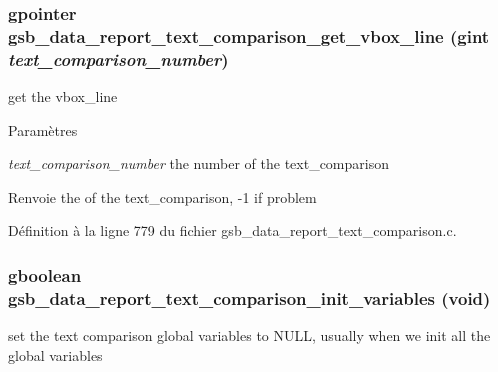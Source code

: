 \subsubsection[{gsb\_\-data\_\-report\_\-text\_\-comparison\_\-get\_\-vbox\_\-line}]{\setlength{\rightskip}{0pt plus 5cm}gpointer gsb\_\-data\_\-report\_\-text\_\-comparison\_\-get\_\-vbox\_\-line (gint {\em text\_\-comparison\_\-number})}\label{gsb__data__report__text__comparison_8h_a98e92783c34e4f3292adf3df1ac8fe4d}
get the vbox\_\-line


\begin{DoxyParams}{Paramètres}
\item[{\em text\_\-comparison\_\-number}]the number of the text\_\-comparison\end{DoxyParams}
\begin{DoxyReturn}{Renvoie}
the of the text\_\-comparison, -\/1 if problem 
\end{DoxyReturn}


Définition à la ligne 779 du fichier gsb\_\-data\_\-report\_\-text\_\-comparison.c.

\subsubsection[{gsb\_\-data\_\-report\_\-text\_\-comparison\_\-init\_\-variables}]{\setlength{\rightskip}{0pt plus 5cm}gboolean gsb\_\-data\_\-report\_\-text\_\-comparison\_\-init\_\-variables (void)}\label{gsb__data__report__text__comparison_8h_a882c29293e2fac42bdd3652b5e320b19}
set the text comparison global variables to NULL, usually when we init all the global variables


